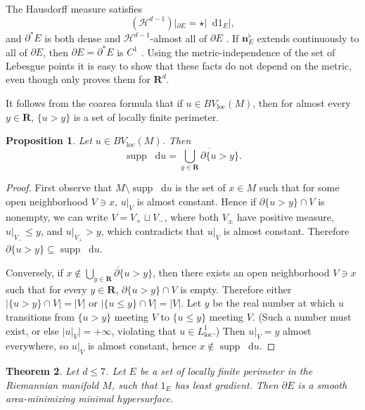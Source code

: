 \documentclass[reqno,11pt]{amsart}
\newcommand{\RR}{\mathbf{R}}
\newcommand*\dif{\mathop{}\!\mathrm{d}}
\DeclareMathOperator{\supp}{supp}
\newcommand{\normal}{\mathbf n}
\newcommand{\loc}{\mathrm{loc}}
\newtheorem{theorem}{Theorem}[section]
\newtheorem{proposition}[theorem]{Proposition}
\theoremstyle{definition}
\numberwithin{equation}{section}
\begin{document}
The Hausdorff measure satisfies
$$(\mathcal H^{d - 1})|_{\partial E} = \star |\dif 1_E|,$$
and $\partial^* E$ is both dense and $\mathcal H^{d - 1}$-almost all of $\partial E$ \cite[Theorem 4.4]{Giusti77}.
If $\normal_E^\flat$ extends continuously to all of $\partial E$, then $\partial E = \partial^* E$ is $C^1$ \cite[Theorem 4.11]{Giusti77}.
Using the metric-independence of the set of Lebesgue points it is easy to show that these facts do not depend on the metric, even though \cite{Giusti77} only proves them for $\RR^d$.

It follows from the coarea formula \cite[Theorem 1.23]{Giusti77} that if $u \in BV_\loc(M)$, then for almost every $y \in \RR$, $\{u > y\}$ is a set of locally finite perimeter.

\begin{proposition}
Let $u \in BV_\loc(M)$. Then 
\begin{equation}\label{level sets define support}
	\supp \dif u = \overline{\bigcup_{y \in \RR} \partial \{u > y\}}.
\end{equation}
\end{proposition}
\begin{proof}
First observe that $M \setminus \supp \dif u$ is the set of $x \in M$ such that for some open neighborhood $V \ni x$, $u|_V$ is almost constant.
Hence if $\partial \{u > y\} \cap V$ is nonempty, we can write $V = V_+ \sqcup V_-$, where both $V_\pm$ have positive measure, $u|_{V_-} \leq y$, and $u|_{V_+} > y$, which contradicts that $u|_V$ is almost constant.
Therefore $\partial \{u > y\} \subseteq \supp \dif u$.

Conversely, if $x \notin \overline{\bigcup_{y \in \RR} \partial \{u > y\}}$, then there exists an open neighborhood $V \ni x$ such that for every $y \in \RR$, $\partial \{u > y\} \cap V$ is empty.
Therefore either $|\{u > y\} \cap V| = |V|$ or $|\{u \leq y\} \cap V| = |V|$.
Let $y$ be the real number at which $u$ transitions from $\{u > y\}$ meeting $V$ to $\{u \leq y\}$ meeting $V$.
(Such a number must exist, or else $|u|_V| = +\infty$, violating that $u \in L^1_\loc$.)
Then $u|_V = y$ almost everywhere, so $u|_V$ is almost constant, hence $x \notin \supp \dif u$.
\end{proof}

\begin{theorem}\label{regularity}
Let $d \leq 7$. Let $E$ be a set of locally finite perimeter in the Riemannian manifold $M$, such that $1_E$ has least gradient.
Then $\partial E$ is a smooth area-minimizing minimal hypersurface.
\end{theorem}
\end{document}
